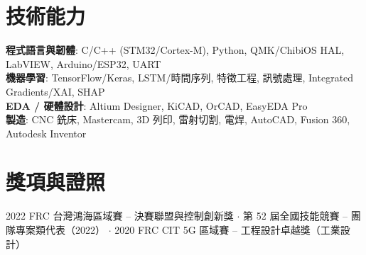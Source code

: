 \documentclass[letterpaper,11pt]{article}
\begin{document}
\section{技術能力}
 \begin{itemize}[leftmargin=0.0in, label={}]
    \small{\item{
     \textbf{程式語言與韌體}{: C/C++ (STM32/Cortex-M), Python, QMK/ChibiOS HAL, LabVIEW, Arduino/ESP32, UART} \\
     \textbf{機器學習}{: TensorFlow/Keras, LSTM/時間序列, 特徵工程, 訊號處理, Integrated Gradients/XAI, SHAP} \\
     \textbf{EDA / 硬體設計}{: Altium Designer, KiCAD, OrCAD, EasyEDA Pro} \\
     \textbf{製造}{: CNC 銑床, Mastercam, 3D 列印, 雷射切割, 電焊, AutoCAD, Fusion 360, Autodesk Inventor} \\
    }}
 \end{itemize}

\section{獎項與證照}
 \begin{itemize}[leftmargin=0.0in, label={}]
    \small{\item{
     2022 FRC 台灣鴻海區域賽 -- 決賽聯盟與控制創新獎 $\cdot$
     第 52 屆全國技能競賽 -- 團隊專案類代表（2022） $\cdot$
     2020 FRC CIT 5G 區域賽 -- 工程設計卓越獎（工業設計）
    }}
 \end{itemize}
\end{document}

